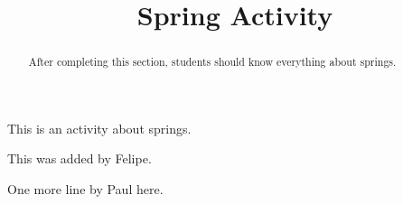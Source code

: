 \documentclass{ximera}
\title{Spring Activity}
\begin{document}
\begin{abstract}
After completing this section, students should know everything about springs.
\end{abstract}


\maketitle

This is an activity about springs.

This was added by Felipe.

One more line by Paul here.
\end{document}
